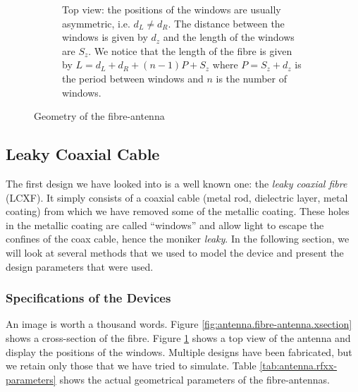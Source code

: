 \begin{figure}
\begin{subfigure}[b]{\textwidth}
   \vspace{0.25cm}
   \caption{Top view: the positions of the windows are usually asymmetric, i.e. $d_L\neq d_R$. The distance between
	    the windows is given by $d_z$ and the length of the windows are $S_z$. We notice that the length of the 
	    fibre is given by $L=d_L+d_R+(n-1)P+S_z$ where $P=S_z+d_z$ is the period between windows and $n$ is the number
	    of windows.}
   \label{fig:antenna.fibre-antenna.topview}
  \end{subfigure}
  \caption{Geometry of the fibre-antenna}
  \label{fig:antenna.fibre-antenna}
\end{figure}

\subsection{Leaky Coaxial Cable}
The first design we have looked into is a well known one:
the \textit{leaky coaxial fibre} (LCXF). It simply consists of
a coaxial cable (metal rod, dielectric layer, metal coating)
from which we have removed some of the metallic coating. 
These holes in the metallic coating are called ``windows'' and
allow light to escape the confines of the coax cable, hence
the moniker \textit{leaky}. In the following section, we will
look at several methods that we used to model the device
and present the design parameters that were used. 

\subsubsection{Specifications of the Devices}
An image is worth a thousand words. Figure \ref{fig:antenna.fibre-antenna.xsection}
shows a cross-section of the fibre. Figure \ref{fig:antenna.fibre-antenna.topview} 
shows a top view of the antenna and display the positions of the windows. 
Multiple designs have been fabricated, but we retain only those that 
we have tried to simulate. Table \ref{tab:antenna.rfxx-parameters} 
shows the actual geometrical parameters of the fibre-antennas.

